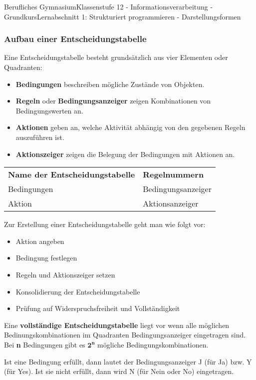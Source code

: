 \documentclass[11pt,oneside,openany,headings=optiontotoc,11pt,numbers=noenddot]{article}
\begin{document}
\begin{worksheet}{Berufliches Gymnasium}{Klassenstufe 12 - Informationsverarbeitung - Grundkurs}{Lernabschnitt 1: Strukturiert programmieren - Darstellungsformen}
		\subsubsection{Aufbau einer Entscheidungstabelle}
		Eine Entscheidungstabelle besteht grundsätzlich aus vier Elementen oder Quadranten:
		\begin{itemize}[label=-]
			\item \textbf{Bedingungen} beschreiben mögliche Zustände von Objekten.
			\item \textbf{Regeln} oder \textbf{Bedingungsanzeiger} zeigen Kombinationen von Bedingungswerten an.
			\item \textbf{Aktionen} geben an, welche Aktivität abhängig von den gegebenen Regeln auszuführen ist.
			\item \textbf{Aktionszeiger} zeigen die Belegung der Bedingungen mit Aktionen an.
		\end{itemize}
		\begin{tabularx}{\textwidth}{|L{4cm}|L{4cm}|}
			\textbf{Name der Entscheidungstabelle} & \textbf{Regelnummern}\\
			Bedingungen & Bedingungsanzeiger\\
			Aktion & Aktionsanzeiger\\
		\end{tabularx}
		\newpage
		Zur Erstellung einer Entscheidungstabelle geht man wie folgt vor:
		\begin{itemize}[label=-]
			\item Aktion angeben
			\item Bedingung festlegen
			\item Regeln und Aktionszeiger setzen
			\item Konsolidierung der Entscheidungstabelle
			\item Prüfung auf Widerspruchsfreiheit und Vollständigkeit
		\end{itemize}
		Eine \textbf{vollständige Entscheidungstabelle} liegt vor wenn alle möglichen Bedinungskombinationen im Quadranten \grqq{}Bedingungsanzeiger\grqq{} eingetragen sind. Bei \textbf{n} Bedingungen gibt es \(\mathbf{2^n}\) mögliche Bedingungskombinationen.\\
		\par\noindent
		Ist eine Bedingung erfüllt, dann lautet der Bedingungsanzeiger J (für Ja) bzw. Y (für Yes). Ist sie nicht erfüllt, dann wird N (für Nein oder No) eingetragen.\\
		\par\noindent

\end{worksheet}
\end{document}

